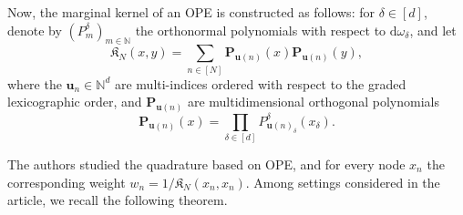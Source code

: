\documentclass[twoside,11pt]{book}
\numberwithin{theorem}{chapter}
\numberwithin{definition}{chapter}
\numberwithin{proposition}{chapter}
\numberwithin{corollary}{chapter}
\numberwithin{example}{chapter}
\numberwithin{lemma}{chapter}
\numberwithin{assumption}{chapter}
\begin{document}
Now, the  marginal kernel of an OPE is constructed as follows: for $\delta \in [d]$, denote by 
$(P^{\delta}_{m})_{m \in \mathbb{N}}$ the orthonormal polynomials with respect to $\mathrm{d}\omega_{\delta}$, and let
\begin{equation}
\mathfrak{K}_{N}(x,y) = \sum\limits_{n \in [N]} \bm{P}_{\bm{u}(n)}(x)\bm{P}_{\bm{u}(n)}(y),
\end{equation}
where the $\bm{u}_{n} \in \mathbb{N}^{d}$ are multi-indices ordered with respect to the graded lexicographic order, and $\bm{P}_{\bm{u}(n)}$ are multidimensional orthogonal polynomials
\begin{equation}
\bm{P}_{\bm{u}(n)}(x) = \prod\limits_{\delta \in [d]} P^{\delta}_{\bm{u}(n)_{\delta}}(x_{\delta}).
\end{equation}


The authors studied the quadrature based on OPE, and for every node $x_{n}$ the corresponding weight $\displaystyle w_{n} =1/\mathfrak{K}_{N}(x_{n},x_{n})$. Among settings considered in the article, we recall the following theorem.

\end{document}
